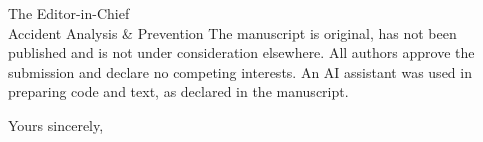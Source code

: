 \documentclass[11pt]{letter}
\begin{document}
\begin{letter}{The Editor-in-Chief\\ Accident Analysis \& Prevention}
The manuscript is original, has not been published and is not under consideration elsewhere. All authors approve the
submission and declare no competing interests. An AI assistant was used in preparing code and text, as declared in the
manuscript.

\closing{Yours sincerely,}
\end{letter}
\end{document}
